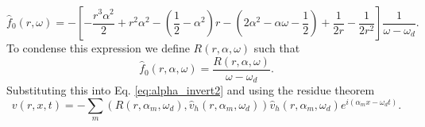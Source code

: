 \documentclass[superscriptaddress, onecolumn, prl]{revtex4}
\begin{document}
\begin{equation}
\hat{f}_0(r,\omega) = -\left[-\frac{r^3 \alpha^2}{2} + r^2 \alpha^2 - \left( \frac{1}{2} - \alpha^2 \right)r - \left( 2 \alpha^2 - \alpha \omega - \frac{1}{2} \right) + \frac{1}{2r} - \frac{1}{2 r^2}\right] \frac{1}{\omega - \omega_d}.
\end{equation}
To condense this expression we define $R(r, \alpha, \omega)$ such that
\begin{equation}
\hat{f}_0(r, \alpha, \omega) = \frac{R(r, \alpha, \omega)}{{\omega - \omega_d}}.
\end{equation}
Substituting this into Eq. \ref{eq:alpha_invert2} and using the residue theorem
\begin{equation}
\label{eq:alpha_invert2}
v(r, x, t) = - \sum_m (R(r, \alpha_m, \omega_d), \hat{v}_h(r, \alpha_m, \omega_d)) \hat{v}_h(r, \alpha_m, \omega_d) e^{i (\alpha_m x - \omega_d t)}. 
\end{equation} 
\end{document}

